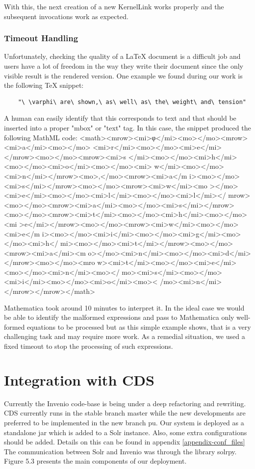 With this, the next creation of a new KernelLink works properly and the subsequent invocations work as expected.

\subsubsection{Timeout Handling}
Unfortunately, checking the quality of a LaTeX document is a difficult job and users have a lot of freedom in the way they write their document since the only visible result is the rendered version. 
One example we found during our work is the following TeX snippet:
\begin{verbatim}
	"\ \varphi\ are\ shown,\ as\ well\ as\ the\ weight\ and\ tension"
\end{verbatim}
A human can easily identify that this corresponds to text and that should be inserted into a proper "mbox" or "text" tag. In this case, the snippet produced the following MathML code:
\small{\codefont <math><mrow><mi>φ</mi><mo></mo><mrow><mi>a</mi><mo></mo>
<mi>r</mi><mo></mo><mi>e</mi></mrow><mo></mo><mrow><mi>s
</mi><mo></mo><mi>h</mi><mo></mo><mi>o</mi><mo></mo><mi>
w</mi><mo></mo><mi>n</mi></mrow><mo>,</mo><mrow><mi>a</m
i><mo></mo><mi>s</mi></mrow><mo></mo><mrow><mi>w</mi><mo
></mo><mi>e</mi><mo></mo><mi>l</mi><mo></mo><mi>l</mi></
mrow><mo></mo><mrow><mi>a</mi><mo></mo><mi>s</mi></mrow>
<mo></mo><mrow><mi>t</mi><mo></mo><mi>h</mi><mo></mo><mi
>e</mi></mrow><mo></mo><mrow><mi>w</mi><mo></mo><mi>e</m
i><mo></mo><mi>i</mi><mo></mo><mi>g</mi><mo></mo><mi>h</
mi><mo></mo><mi>t</mi></mrow><mo></mo><mrow><mi>a</mi><m
o></mo><mi>n</mi><mo></mo><mi>d</mi></mrow><mo></mo><mro
w><mi>t</mi><mo></mo><mi>e</mi><mo></mo><mi>n</mi><mo></
mo><mi>s</mi><mo></mo><mi>i</mi><mo></mo><mi>o</mi><mo><
/mo><mi>n</mi></mrow></mrow></math>
}

Mathematica took around 10 minutes to interpret it.
In the ideal case we would be able to identify the malformed expressions and pass to Mathematica only well-formed equations to be processed but as this simple example shows, that is a very challenging task and may require more work.
As a remedial situation, we used a fixed timeout to stop the processing of such expressions.

\section{Integration with CDS}
Currently the Invenio code-base is being under a deep refactoring and rewriting. CDS currently runs in the stable branch {\codefont master} while the new developments are preferred to be implemented in the new branch {\codefont pu}. 
Our system is deployed as a standalone {\codefont jar} which is added to a Solr instance. Also, some extra configurations should be added. Details on this can be found in appendix \ref{appendix-conf_files}
The communication between Solr and Invenio was through the library {\codefont solrpy}. 
Figure 5.3 presents the main components of our deployment.

